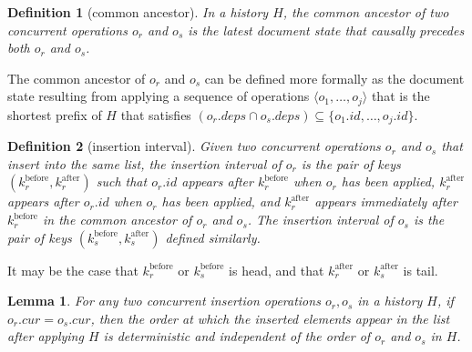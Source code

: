 \documentclass[10pt,journal,compsoc]{IEEEtran}
\newtheorem{definition}{Definition}
\newtheorem{lemma}[theorem]{Lemma}
\begin{document}
\begin{definition}[common ancestor]\label{def:common-ancestor}
In a history $H$, the \emph{common ancestor} of two concurrent operations $o_r$ and $o_s$ is the latest document state that causally precedes both $o_r$ and $o_s$.
\end{definition}

The common ancestor of $o_r$ and $o_s$ can be defined more formally as the document state resulting from applying a sequence of operations $\langle o_1, \dots, o_j \rangle$ that is the shortest prefix of $H$ that satisfies $(o_r.\mathit{deps} \cap o_s.\mathit{deps}) \subseteq \{o_1.\mathit{id}, \dots, o_j.\mathit{id}\}$.

\begin{definition}[insertion interval]\label{def:insert-interval}
Given two concurrent operations $o_r$ and $o_s$ that insert into the same list, the \emph{insertion interval} of $o_r$ is the pair of keys $(k_r^\mathrm{before}, k_r^\mathrm{after})$ such that $o_r.\mathit{id}$ appears after $k_r^\mathrm{before}$ when $o_r$ has been applied, $k_r^\mathrm{after}$ appears after $o_r.\mathit{id}$ when $o_r$ has been applied, and $k_r^\mathrm{after}$ appears immediately after $k_r^\mathrm{before}$ in the common ancestor of $o_r$ and $o_s$. The insertion interval of $o_s$ is the pair of keys $(k_s^\mathrm{before}, k_s^\mathrm{after})$ defined similarly.
\end{definition}

It may be the case that $k_r^\mathrm{before}$ or $k_s^\mathrm{before}$ is \textsf{head}, and that $k_r^\mathrm{after}$ or $k_s^\mathrm{after}$ is \textsf{tail}.

\begin{lemma}\label{lem:insert-conflict}
For any two concurrent insertion operations $o_r, o_s$ in a history $H$, if $o_r.\mathit{cur} = o_s.\mathit{cur}$, then the order at which the inserted elements appear in the list after applying $H$ is deterministic and independent of the order of $o_r$ and $o_s$ in $H$.
\end{lemma}
\end{document}
